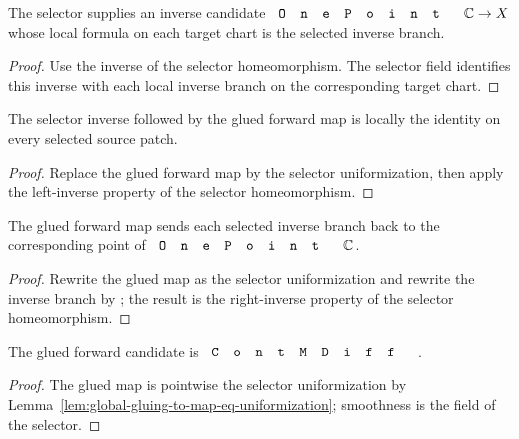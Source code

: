 \begin{lemma}
\label{lem:global-gluing-inv-map-exists}
The selector supplies an inverse candidate \(\code{OnePoint}\,\C\to X\) whose
local formula on each target chart is the selected inverse branch.
\leanok
\end{lemma}
\begin{proof}\leanok
Use the inverse of the selector homeomorphism. The selector field
 identifies this inverse with each
local inverse branch on the corresponding target chart.
\end{proof}

\begin{lemma}
\label{lem:global-gluing-local-left-inverse}
The selector inverse followed by the glued forward map is locally the identity
on every selected source patch.
\leanok
\end{lemma}
\begin{proof}\leanok
Replace the glued forward map by the selector uniformization, then apply the
left-inverse property of the selector homeomorphism.
\end{proof}

\begin{lemma}
\label{lem:global-gluing-local-right-inverse}
The glued forward map sends each selected inverse branch back to the
corresponding point of \(\code{OnePoint}\,\C\).
\leanok
\end{lemma}
\begin{proof}\leanok
Rewrite the glued map as the selector uniformization and rewrite the inverse
branch by ; the result is the
right-inverse property of the selector homeomorphism.
\end{proof}

\begin{lemma}
\label{lem:global-gluing-contmdiff-to-map}
The glued forward candidate is \(\code{ContMDiff}\).
\leanok
\end{lemma}
\begin{proof}\leanok
The glued map is pointwise the selector uniformization by
Lemma~\ref{lem:global-gluing-to-map-eq-uniformization}; smoothness is the
 field of the selector.
\end{proof}

